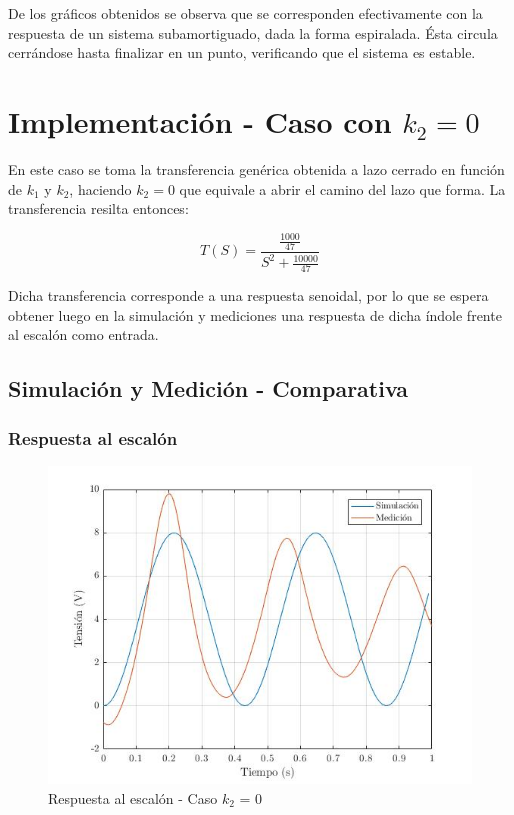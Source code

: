 \documentclass{article}
\begin{document}
De los gráficos obtenidos se observa que se corresponden efectivamente con la respuesta de un sistema subamortiguado, dada la forma espiralada. Ésta circula cerrándose hasta finalizar en un punto, verificando que el sistema es estable.

\section{Implementación - Caso con $k_2 = 0$}

En este caso se toma la transferencia genérica obtenida a lazo cerrado en función de $k_1$ y $k_2$, haciendo $k_2 = 0$ que equivale a abrir el camino del lazo que forma. La transferencia resilta entonces:

\[
T(S) = \frac{\frac{1000}{47}}{S^2 + \frac{10000}{47}}
\]

Dicha transferencia corresponde a una respuesta senoidal, por lo que se espera obtener luego en la simulación y mediciones una respuesta de dicha índole frente al escalón como entrada.

\subsection{Simulación y Medición - Comparativa}

\subsubsection{Respuesta al escalón}

\begin{figure}[H]
\centering
\includegraphics[width=0.8\linewidth]{../graficos/escalonSinK2.jpg}
\caption{Respuesta al escalón - Caso $k_2$ = 0}
\label{fig:escalonSinK2}
\end{figure}
\end{document}

